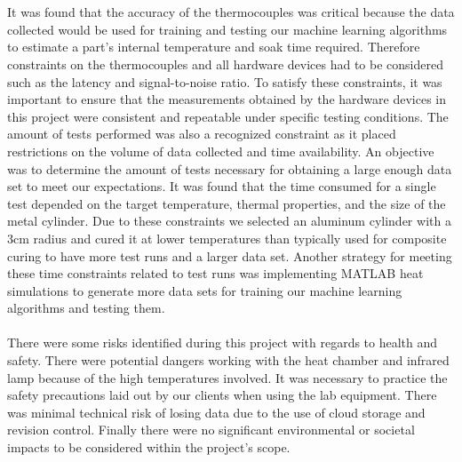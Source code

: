\\\\ 
It was found that the accuracy of the thermocouples was critical because the data collected would be used for training and testing our machine learning algorithms to estimate a part’s internal temperature and soak time required. Therefore constraints on the thermocouples and all hardware devices had to be considered such as the latency and signal-to-noise ratio. To satisfy these constraints, it was important to ensure that the measurements obtained by the hardware devices in this project were consistent and repeatable under specific testing conditions.
\clearpage
The amount of tests performed was also a recognized constraint as it placed restrictions on the volume of data collected and time availability. An objective was to determine the amount of tests necessary for obtaining a large enough data set to meet our expectations. It was found that the time consumed for a single test depended on the target temperature, thermal properties, and the size of the metal cylinder.  Due to these constraints we selected an aluminum cylinder with a 3cm radius and cured it at lower temperatures than typically used for composite curing to have more test runs and a larger data set. Another strategy for meeting these time constraints related to test runs was implementing MATLAB heat simulations to generate more data sets for training our machine learning algorithms and testing them.\\\\
There were some risks identified during this project with regards to health and safety. There were potential dangers working with the heat chamber and infrared lamp because of the high temperatures involved. It was necessary to practice the safety precautions laid out by our clients when using the lab equipment. There was minimal technical risk of losing data due to the use of cloud storage and revision control. Finally there were no significant environmental or societal impacts to be considered within the project's scope.
